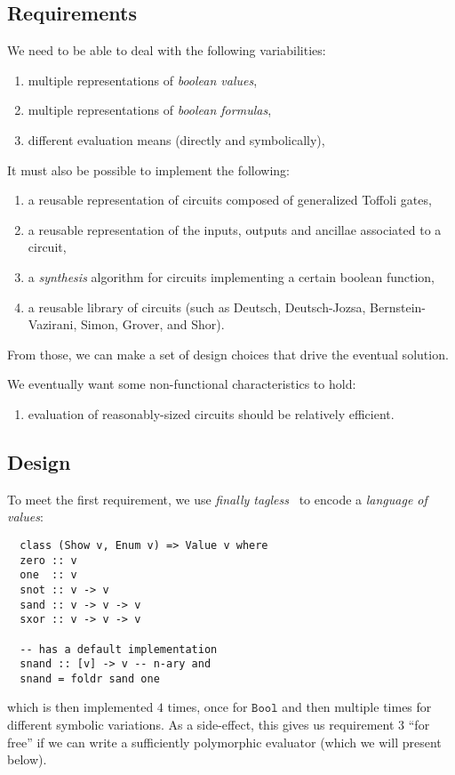 \documentclass[sigplan,review]{acmart}
\theoremstyle{definition}
\begin{document}
\subsection{Requirements}

We need to be able to deal with the following variabilities:
\begin{enumerate}
  \item multiple representations of \emph{boolean values},
  \item multiple representations of \emph{boolean formulas},
  \item different evaluation means (directly and symbolically),
\end{enumerate}

\noindent It must also be possible to implement the following:
\begin{enumerate}[resume]
  \item a reusable representation of circuits composed of generalized Toffoli gates,
  \item a reusable representation of the inputs, outputs and ancillae associated to
    a circuit,
  \item a \emph{synthesis} algorithm for circuits implementing a certain boolean
    function,
  \item a reusable library of circuits (such as
    Deutsch, Deutsch-Jozsa, Bernstein-Vazirani, Simon, Grover, and Shor). 
\end{enumerate}
\noindent From those, we can make a
set of design choices that drive the eventual solution.

We eventually want some non-functional characteristics to hold:
\begin{enumerate}[resume]
  \item evaluation of reasonably-sized circuits should be relatively efficient.
\end{enumerate}

\subsection{Design}

To meet the first requirement, we use \emph{finally tagless}~\cite{tagless}
to encode a \emph{language of values}:
\begin{verbatim}
  class (Show v, Enum v) => Value v where
  zero :: v
  one  :: v
  snot :: v -> v
  sand :: v -> v -> v
  sxor :: v -> v -> v

  -- has a default implementation
  snand :: [v] -> v -- n-ary and
  snand = foldr sand one
\end{verbatim}
\noindent which is then implemented $4$ times, once for $\texttt{Bool}$
and then multiple times for different symbolic variations. As a side-effect,
this gives us requirement $3$ ``for free'' if we can write a sufficiently
polymorphic evaluator (which we will present below).
\end{document}
